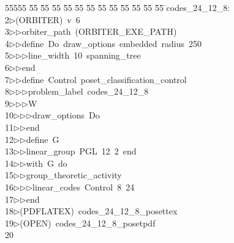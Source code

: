 %
%
\begin{tabbing}
55555 \= 55 \= 55 \= 55 \= 55 \= 55 \= 55 \= 55 \= 55 \= 55 \= 55 \= 55 \= 55 \= \>codes\_24\_12\_8:\\[0pt]
2\>$\triangleright$\>(ORBITER)\ v\ 6\ \\[0pt]
3\>$\triangleright$\>$\triangleright$\>orbiter\_path\ (ORBITER\_EXE\_PATH)\ \\[0pt]
4\>$\triangleright$\>$\triangleright$\>define\ Do\ draw\_options\ embedded\ radius\ 250\ \\[0pt]
5\>$\triangleright$\>$\triangleright$\>$\triangleright$\>line\_width\ 10\ spanning\_tree\ \\[0pt]
6\>$\triangleright$\>$\triangleright$\>end\ \\[0pt]
7\>$\triangleright$\>$\triangleright$\>define\ Control\ poset\_classification\_control\ \\[0pt]
8\>$\triangleright$\>$\triangleright$\>$\triangleright$\>problem\_label\ codes\_24\_12\_8\ \\[0pt]
9\>$\triangleright$\>$\triangleright$\>$\triangleright$\>W\ \\[0pt]
10\>$\triangleright$\>$\triangleright$\>$\triangleright$\>draw\_options\ Do\ \\[0pt]
11\>$\triangleright$\>$\triangleright$\>end\ \\[0pt]
12\>$\triangleright$\>$\triangleright$\>define\ G\ \\[0pt]
13\>$\triangleright$\>$\triangleright$\>linear\_group\ PGL\ 12\ 2\ end\ \\[0pt]
14\>$\triangleright$\>$\triangleright$\>with\ G\ do\ \\[0pt]
15\>$\triangleright$\>$\triangleright$\>group\_theoretic\_activity\ \\[0pt]
16\>$\triangleright$\>$\triangleright$\>$\triangleright$\>linear\_codes\ Control\ 8\ 24\ \\[0pt]
17\>$\triangleright$\>$\triangleright$\>end\\[0pt]
18\>$\triangleright$\>(PDFLATEX)\ codes\_24\_12\_8\_posettex\\[0pt]
19\>$\triangleright$\>(OPEN)\ codes\_24\_12\_8\_posetpdf\\[0pt]
20\>\end{tabbing}
